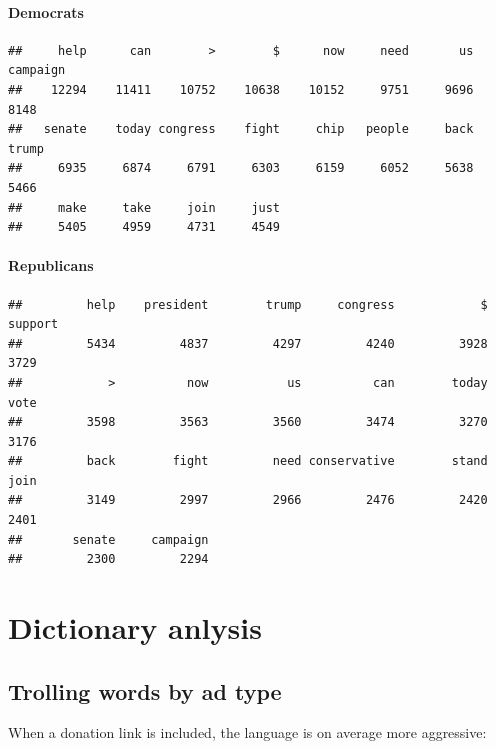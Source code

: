 \documentclass[
  12pt,
]{article}
\begin{document}
\hypertarget{democrats}{%
\paragraph{Democrats}\label{democrats}}

\begin{verbatim}
##     help      can        >        $      now     need       us campaign 
##    12294    11411    10752    10638    10152     9751     9696     8148 
##   senate    today congress    fight     chip   people     back    trump 
##     6935     6874     6791     6303     6159     6052     5638     5466 
##     make     take     join     just 
##     5405     4959     4731     4549
\end{verbatim}

\hypertarget{republicans}{%
\paragraph{Republicans}\label{republicans}}

\begin{verbatim}
##         help    president        trump     congress            $      support 
##         5434         4837         4297         4240         3928         3729 
##            >          now           us          can        today         vote 
##         3598         3563         3560         3474         3270         3176 
##         back        fight         need conservative        stand         join 
##         3149         2997         2966         2476         2420         2401 
##       senate     campaign 
##         2300         2294
\end{verbatim}

\hypertarget{dictionary-anlysis}{%
\section{Dictionary anlysis}\label{dictionary-anlysis}}

\hypertarget{trolling-words-by-ad-type}{%
\subsection{Trolling words by ad type}\label{trolling-words-by-ad-type}}

When a donation link is included, the language is on average more aggressive:
\end{document}

